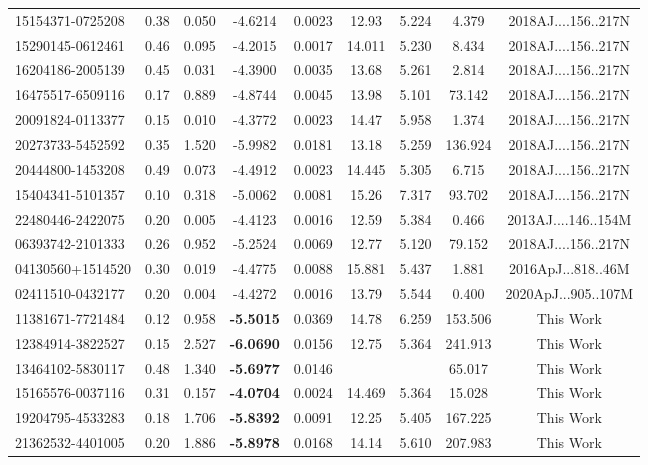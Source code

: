 \begin{tabular}{lcccccccc}
15154371-0725208 & 0.38 & 0.050 & -4.6214 & 0.0023 & 12.93 & 5.224 & 4.379 & 2018AJ....156..217N  \\
15290145-0612461 & 0.46 & 0.095 & -4.2015 & 0.0017 & 14.011 & 5.230 & 8.434 & 2018AJ....156..217N  \\
16204186-2005139 & 0.45 & 0.031 & -4.3900 & 0.0035 & 13.68 & 5.261 & 2.814 & 2018AJ....156..217N  \\
16475517-6509116 & 0.17 & 0.889 & -4.8744 & 0.0045 & 13.98 & 5.101 & 73.142 & 2018AJ....156..217N  \\
20091824-0113377 & 0.15 & 0.010 & -4.3772 & 0.0023 & 14.47 & 5.958 & 1.374 & 2018AJ....156..217N  \\
20273733-5452592 & 0.35 & 1.520 & -5.9982 & 0.0181 & 13.18 & 5.259 & 136.924 & 2018AJ....156..217N  \\
20444800-1453208 & 0.49 & 0.073 & -4.4912 & 0.0023 & 14.445 & 5.305 & 6.715 & 2018AJ....156..217N  \\
15404341-5101357 & 0.10 & 0.318 & -5.0062 & 0.0081 & 15.26 & 7.317 & 93.702 & 2018AJ....156..217N  \\
22480446-2422075 & 0.20 & 0.005 & -4.4123 & 0.0016 & 12.59 & 5.384 & 0.466 & 2013AJ....146..154M  \\
06393742-2101333 & 0.26 & 0.952 & -5.2524 & 0.0069 & 12.77 & 5.120 & 79.152 & 2018AJ....156..217N  \\
04130560+1514520 & 0.30 & 0.019 & -4.4775 & 0.0088 & 15.881 & 5.437 & 1.881 & 2016ApJ...818..46M  \\
02411510-0432177 & 0.20 & 0.004 & -4.4272 & 0.0016 & 13.79 & 5.544 & 0.400 & 2020ApJ...905..107M  \\
  11381671-7721484 & 0.12 & 0.958 & \textbf{-5.5015} & 0.0369 & 14.78 & 6.259 & 153.506 & This Work  \\
  12384914-3822527 & 0.15 & 2.527 & \textbf{-6.0690} & 0.0156 & 12.75 & 5.364 & 241.913 & This Work  \\
  13464102-5830117 & 0.48 & 1.340 & \textbf{-5.6977} & 0.0146 &  &  & 65.017 & This Work  \\
  15165576-0037116 & 0.31 & 0.157 & \textbf{-4.0704} & 0.0024 & 14.469 & 5.364 & 15.028 & This Work  \\
  19204795-4533283 & 0.18 & 1.706 & \textbf{-5.8392} & 0.0091 & 12.25 & 5.405 & 167.225 & This Work  \\
  21362532-4401005 & 0.20 & 1.886 & \textbf{-5.8978} & 0.0168 & 14.14 & 5.610 & 207.983 & This Work  \\
\hline
\end{tabular}


